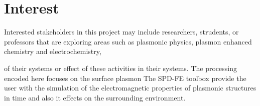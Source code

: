 \documentclass{article}
\begin{document}
 

\section*{Interest}

Interested stakeholders in this project may include researchers, strudents, or 
professors that are exploring areas such as plasmonic physics, plasmon enhanced chemistry and electrochemistry, 

of their systems or effect of these activities in their systems. The processing 
encoded here  focuses on the surface plasmon
The SPD-FE toolbox provide the user with the simulation of the electromagnetic properties of plasmonic structures in time and also it effects on the surrounding environment.


\end{document}
